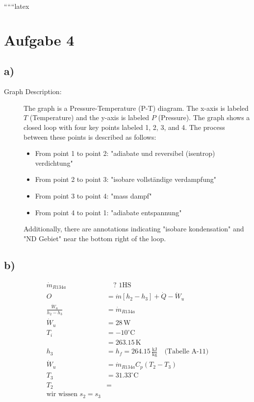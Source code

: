 
``````latex


\section*{Aufgabe 4}

\subsection*{a)}

\begin{description}
    \item[Graph Description:] The graph is a Pressure-Temperature (P-T) diagram. The x-axis is labeled \( T \) (Temperature) and the y-axis is labeled \( P \) (Pressure). The graph shows a closed loop with four key points labeled 1, 2, 3, and 4. The process between these points is described as follows:
    \begin{itemize}
        \item From point 1 to point 2: "adiabate und reversibel (isentrop) verdichtung"
        \item From point 2 to point 3: "isobare vollständige verdampfung"
        \item From point 3 to point 4: "mass dampf"
        \item From point 4 to point 1: "adiabate entspannung"
    \end{itemize}
    Additionally, there are annotations indicating "isobare kondensation" and "ND Gebiet" near the bottom right of the loop.
\end{description}

\subsection*{b)}

\begin{align*}
    \dot{m}_{R134a} & \quad \text{? 1HS} \\
    O &= \dot{m} \left[ h_2 - h_3 \right] + \dot{Q} - \dot{W}_u \\
    \frac{\dot{W}_u}{h_2 - h_3} &= \dot{m}_{R134a} \\
    \dot{W}_u &= 28 \, \text{W} \\
    T_i &= -10^\circ \text{C} \\
    &= 263.15 \, \text{K} \\
    h_3 &= h_f = 264.15 \, \frac{\text{kJ}}{\text{kg}} \quad \text{(Tabelle A-11)} \\
    \dot{W}_u &= \dot{m}_{R134a} C_p (T_2 - T_3) \\
    T_3 &= 31.33^\circ \text{C} \\
    T_2 &= \\
    \text{wir wissen } s_2 = s_3
\end{align*}

